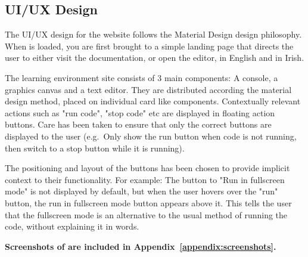 \subsection{UI/UX Design}

The UI/UX design for the \trys{} website follows the Material Design\cite{material-design} design philosophy. When \trys{} is loaded, you are first brought to a simple landing page that directs the user to either visit the documentation, or open the editor, in English and in Irish.

The learning environment site consists of 3 main components: A console, a graphics canvas and a text editor. They are distributed according the material design method, placed on individual card like components. Contextually relevant actions such as "run code", "stop code" etc are displayed in floating action buttons. Care has been taken to ensure that only the correct buttons are displayed to the user (e.g.\ Only show the run button when code is not running, then switch to a stop button while it is running).

The positioning and layout of the buttons has been chosen to provide implicit context to their functionality. For example: The button to "Run in fullscreen mode" is not displayed by default, but when the user hovers over the "run" button, the run in fullscreen mode button appears above it. This tells the user that the fullscreen mode is an alternative to the usual method of running the code, without explaining it in words.

\textbf{Screenshots of \trys{} are included in Appendix~\ref{appendix:screenshots}.}
